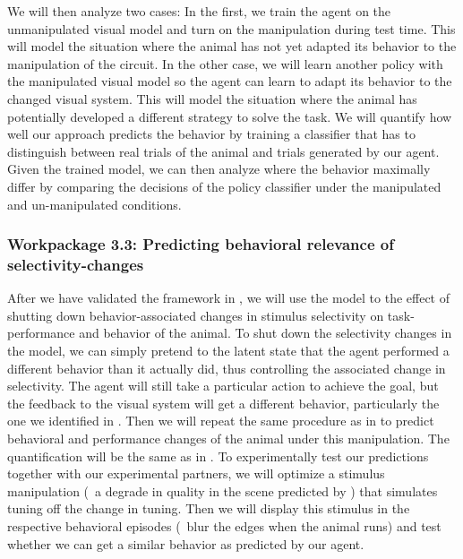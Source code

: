 \documentclass[B2,COG]{ercgrant}
\begin{document}
We will then analyze two cases: In the first, we train the agent on the unmanipulated visual model and turn on the manipulation during test time. 
This will model the situation where the animal has not yet adapted its behavior to the manipulation of the circuit. 
In the other case, we will learn another policy with the manipulated visual model so the agent can learn to adapt its behavior to the changed visual system. 
This will model the situation where the animal has potentially developed a different strategy to solve the task. 
We will quantify how well our approach predicts the behavior by training a classifier that has to distinguish between real trials of the animal and trials generated by our agent. 
Given the trained model, we can then analyze where the behavior maximally differ by comparing the decisions of the policy classifier under the manipulated and un-manipulated conditions. 

\subsubsection{Workpackage 3.3: Predicting behavioral relevance of selectivity-changes\hfill{}}

After we have validated the framework in , we will use the model to the effect of shutting down behavior-associated changes in stimulus selectivity on task-performance and behavior of the animal. 
To shut down the selectivity changes in the model, we can simply pretend to the latent state that the agent performed a different behavior than it actually did, thus controlling the associated change in selectivity. 
The agent will still take a particular action to achieve the goal, but the feedback to the visual system will get a different behavior, particularly the one we identified in .
Then we will repeat the same procedure as in  to predict behavioral and performance changes of the animal under this manipulation. 
The quantification will be the same as in .
To experimentally test our predictions together with our experimental partners, we will optimize a stimulus manipulation (\eg~a degrade in quality in the scene predicted by ) that simulates tuning off the change in tuning. 
Then we will display this stimulus in the respective behavioral episodes (\eg~blur the edges when the animal runs) and test whether we can get a similar behavior as predicted by our agent.
\end{document}
